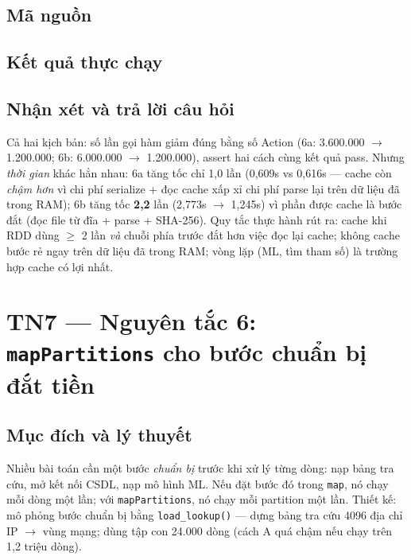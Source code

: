 \documentclass[12pt,a4paper,oneside]{article}
\begin{document}
\subsection{Mã nguồn}



\subsection{Kết quả thực chạy}



\subsection{Nhận xét và trả lời câu hỏi}

Cả hai kịch bản: số lần gọi hàm giảm đúng bằng số Action (6a: 3.600.000 $\to$ 1.200.000; 6b: 6.000.000 $\to$ 1.200.000), assert hai cách cùng kết quả pass. Nhưng \emph{thời gian} khác hẳn nhau: 6a tăng tốc chỉ 1,0 lần (0,609s vs 0,616s --- cache còn \emph{chậm hơn} vì chi phí serialize + đọc cache xấp xỉ chi phí parse lại trên dữ liệu đã trong RAM); 6b tăng tốc \textbf{2,2} lần (2,773s $\to$ 1,245s) vì phần được cache là bước đắt (đọc file từ đĩa + parse + SHA-256). Quy tắc thực hành rút ra: cache khi RDD dùng $\geq$ 2 lần \emph{và} chuỗi phía trước đắt hơn việc đọc lại cache; không cache bước rẻ ngay trên dữ liệu đã trong RAM; vòng lặp (ML, tìm tham số) là trường hợp cache có lợi nhất.

\section{TN7 --- Nguyên tắc 6: \texttt{mapPartitions} cho bước chuẩn bị đắt tiền}
\label{sec:tn7}

\subsection{Mục đích và lý thuyết}

Nhiều bài toán cần một bước \emph{chuẩn bị} trước khi xử lý từng dòng: nạp bảng tra cứu, mở kết nối CSDL, nạp mô hình ML. Nếu đặt bước đó trong \texttt{map}, nó chạy mỗi dòng một lần; với \texttt{mapPartitions}, nó chạy mỗi partition một lần. Thiết kế: mô phỏng bước chuẩn bị bằng \texttt{load\_lookup()} --- dựng bảng tra cứu 4096 địa chỉ IP $\to$ vùng mạng; dùng tập con 24.000 dòng (cách A quá chậm nếu chạy trên 1,2 triệu dòng).
\end{document}
